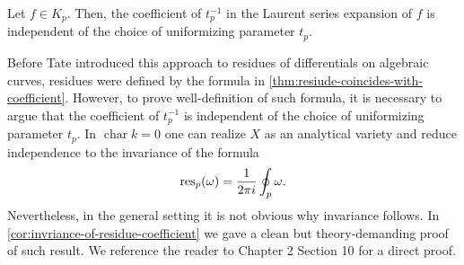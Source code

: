 \begin{corollary}\label{cor:invriance-of-residue-coefficient}
	Let $f\in K_{p}$. Then, the coefficient of $t_{p}^{-1}$ in the Laurent series expansion of $f$ is independent of the choice of uniformizing parameter $t_{p}$.	
\end{corollary}
\begin{remark}\label{rem:previouses-approaches-residues}
	Before Tate introduced this approach to residues of differentials on algebraic curves, residues were defined by the formula in \cref{thm:resiude-coincides-with-coefficient}. However, to prove well-definition of such formula, it is necessary to argue that the coefficient of $t_{p}^{-1}$ is independent of the choice of uniformizing parameter $t_{p}$. In $\operatorname{char}k = 0$ one can realize $X$ as an analytical variety and reduce independence to the invariance of the formula
	\[
		\operatorname{res}_{p}(\omega) = \frac{1}{2\pi i}\oint_{p} \omega.
	\]
	Nevertheless, in the general setting it is not obvious why invariance follows. In \cref{cor:invriance-of-residue-coefficient} we gave a clean but theory-demanding proof of such result. We reference the reader to \cite{serre} Chapter 2 Section 10 for a direct proof.
\end{remark}
